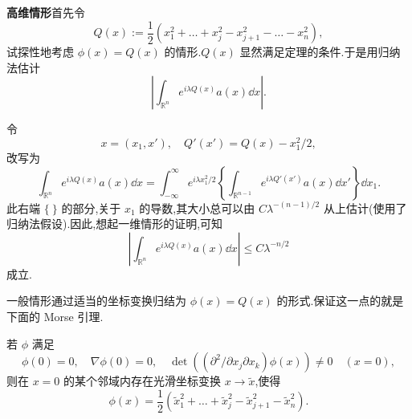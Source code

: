\noindent\textbf{高维情形}\quad 首先令
\begin{equation*}
Q(x) := \frac{1}{2}\left(x_{1}^{2} + \ldots + x_{j}^{2} - x_{j+1}^{2} - \ldots - x_{n}^{2}\right),
\end{equation*}
试探性地考虑 $\phi(x) = Q(x)$ 的情形.$Q(x)$ 显然满足定理的条件.于是用归纳法估计
\begin{equation*}
\left|\int_{\mathbb{R}^{n}}e^{i\lambda Q(x)}a(x)\dd x\right|.
\end{equation*}

令
\begin{equation*}
x = (x_{1}, x'), \quad Q'(x') = Q(x) - x_{1}^{2}/2,
\end{equation*}
改写为
\begin{equation*}
\int_{\mathbb{R}^{n}}e^{i\lambda Q(x)}a(x)\dd x = \int_{-\infty}^{\infty}e^{i\lambda x_{1}^{2}/2}\left\{\int_{\mathbb{R}^{n-1}}e^{i\lambda Q'(x')}a(x)\dd x'\right\}\dd x_{1}.
\end{equation*}
此右端 $\{\ \}$ 的部分,关于 $x_{1}$ 的导数,其大小总可以由 $C\lambda^{-(n-1)/2}$ 从上估计(使用了归纳法假设).因此,想起一维情形的证明,可知
\begin{equation*}
\left|\int_{\mathbb{R}^{n}}e^{i\lambda Q(x)}a(x)\dd x\right| \leq C\lambda^{-n/2}
\end{equation*}
成立.

一般情形通过适当的坐标变换归结为 $\phi(x) = Q(x)$ 的形式.保证这一点的就是下面的 Morse 引理.

\begin{lemma}[Morse]\label{lem:4.4.4}
若 $\phi$ 满足
\begin{equation*}
\phi(0) = 0, \quad \nabla\phi(0) = 0, \quad \det\left((\partial^{2}/\partial x_{j}\partial x_{k})\phi(x)\right) \neq 0 \quad (x = 0),
\end{equation*}
则在 $x = 0$ 的某个邻域内存在光滑坐标变换 $x \to \tilde{x}$,使得
\begin{equation*}
\phi(x) = \frac{1}{2}\left(\tilde{x}_{1}^{2} + \ldots + \tilde{x}_{j}^{2} - \tilde{x}_{j+1}^{2} - \tilde{x}_{n}^{2}\right).
\end{equation*}
\end{lemma}

